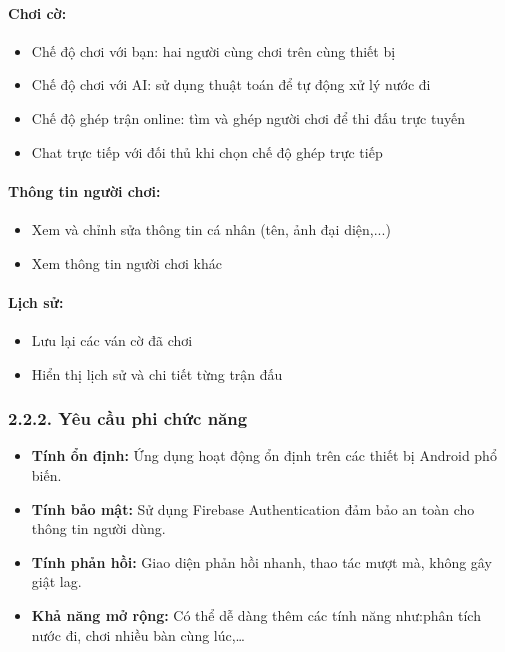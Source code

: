 \documentclass[a4paper,12pt]{article}
\begin{document}
\paragraph{Chơi cờ:} %
\begin{itemize}[label=·]
    \item Chế độ chơi với bạn: hai người cùng chơi trên cùng thiết bị
    \item Chế độ chơi với AI: sử dụng thuật toán để tự động xử lý nước đi
    \item Chế độ ghép trận online: tìm và ghép người chơi để thi đấu trực tuyến
    \item Chat trực tiếp với đối thủ khi chọn chế độ ghép trực tiếp
\end{itemize}

\paragraph{Thông tin người chơi:} %
\begin{itemize}[label=·]
    \item Xem và chỉnh sửa thông tin cá nhân (tên, ảnh đại diện,...)
    \item Xem thông tin người chơi khác
\end{itemize}

\paragraph{Lịch sử:} %
\begin{itemize}[label=·]
    \item Lưu lại các ván cờ đã chơi
    \item Hiển thị lịch sử và chi tiết từng trận đấu
\end{itemize}

\subsubsection*{2.2.2. Yêu cầu phi chức năng} %

\justify
\begin{itemize}[label=·]
    \item \textbf{Tính ổn định:} Ứng dụng hoạt động ổn định trên các thiết bị Android phổ biến.
    \item \textbf{Tính bảo mật:} Sử dụng Firebase Authentication đảm bảo an toàn cho thông tin người dùng.
    \item \textbf{Tính phản hồi:} Giao diện phản hồi nhanh, thao tác mượt mà, không gây giật lag.
    \item \textbf{Khả năng mở rộng:} Có thể dễ dàng thêm các tính năng như:phân tích nước đi, chơi nhiều bàn cùng lúc,…
\end{itemize}
\end{document}
